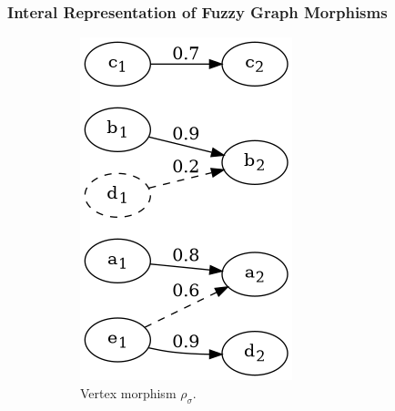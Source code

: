 \begin{frame}
	\frametitle{Interal Representation of Fuzzy Graph Morphisms}

	\begin{figure}[htbp]
		\centering
		\begin{subfigure}[t]{0.20\textwidth}
			\centering
			\includegraphics[width=\linewidth,valign=t]{inc/fuzzy_graph_theory/fuzzy_graph_morphism_internal_rho_sigma.png}
			\caption{Vertex morphism $\rho_{\sigma}$.}
		\end{subfigure}
		\quad
		\begin{subfigure}[t]{0.40\textwidth}
			\centering

\end{subfigure}
\end{figure}
\end{frame}

